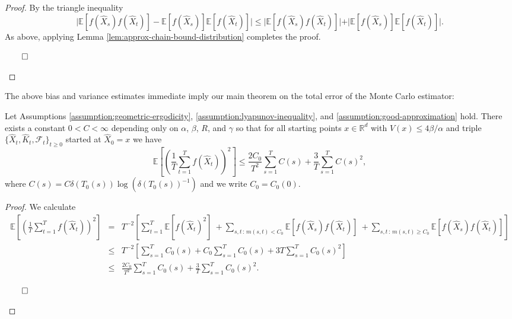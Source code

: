 \begin{proof}
 By the triangle inequality 
 \begin{equation*}
    \vert\mathbb{E}[f(\hat{X}_s) f(\hat{X}_t)] - \mathbb{E}[f(\hat{X}_s)] \mathbb{E}[f(\hat{X}_t)] \vert \leq \vert\mathbb{E}[f(\hat{X}_s) f(\hat{X}_t)] \vert + \vert \mathbb{E}[f(\hat{X}_s)] \mathbb{E}[f(\hat{X}_t)] \vert.
 \end{equation*}
 As above, applying Lemma \ref{lem:approx-chain-bound-distribution} completes the proof.
 \begin{flushright}$\qed$\end{flushright}
\end{proof}

The above bias and variance estimates immediate imply our main theorem on the total error of the Monte Carlo estimator: 

\begin{theorem} \label{thm_main_mce}
Let Assumptions \ref{assumption:geometric-ergodicity}, \ref{assumption:lyapunov-inequality}, and \ref{assumption:good-approximation} hold. There exists a constant $0 < C < \infty$ depending only on $\alpha$, $\beta$, $R$, and $\gamma$ so that for all starting points $x \in \mathbb{R}^{d}$ with $V(x) \leq 4 \beta / \alpha$ and triple $\{\hat{X}_t, \hat{K}_t, \mathcal{F}_t\}_{t \geq 0}$ started at $\hat{X}_0 = x$ we have 
\begin{equation*}
\mathbb{E}\left[ \left( \frac{1}{T} \sum_{t=1}^{T} f(\hat{X}_t) \right)^2 \right]  \leq \frac{2C_{0}}{T^{2}}\sum_{s=1}^{T} C(s) + \frac{3}{T} \sum_{s=1}^{T} C(s)^{2},
\end{equation*}
where $C(s) = C \delta(T_{0}(s)) \log(\delta(T_{0}(s))^{-1})$ and we write $C_{0} = C_{0}(0)$.
\label{thm:expected-error}
\end{theorem}
\begin{proof}
We calculate
\begin{eqnarray*}
\mathbb{E}\left[ \left( \frac{1}{T} \sum_{t=1}^{T} f(\hat{X}_t) \right)^2 \right]
&=& T^{-2}\left[\sum_{t=1}^{T} \mathbb{E}[f(\hat{X}_{t})^{2}] \ + \sum_{s,t \, : \, m(s,t) < C_{0}} \mathbb{E}[f(\hat{X}_{s}) f(\hat{X}_{t})]  \ + \sum_{s,t \, : \, m(s,t) \geq C_{0}} \mathbb{E}[f(\hat{X}_{s}) f(\hat{X}_{t})] \right] \\
&\leq& T^{-2} \left[\sum_{s=1}^{T} C_{0}(s) + C_{0} \sum_{s=1}^{T} C_{0}(s) + 3 T \sum_{s=1}^{T} C_{0}(s)^{2} \right] \\
&\leq& \frac{2C_{0}}{T^{2}}\sum_{s=1}^{T} C_{0}(s) + \frac{3}{T} \sum_{s=1}^{T} C_{0}(s)^{2}.
\end{eqnarray*}
\begin{flushright}$\qed$\end{flushright}
\end{proof}

